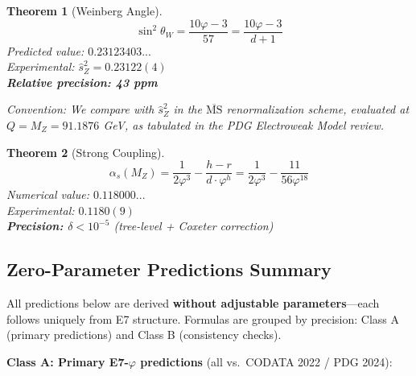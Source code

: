 \documentclass[11pt,a4paper]{article}
\newtheorem{theorem}{Theorem}
\begin{document}
\begin{theorem}[Weinberg Angle]
\begin{equation}
\sin^2\theta_W = \frac{10\varphi - 3}{57} = \frac{10\varphi - 3}{d + 1}
\end{equation}
Predicted value: $0.23123403...$\\
Experimental: $\hat{s}_Z^2 = 0.23122(4)$~\cite{PDG2024}\\
\textbf{Relative precision: 43 ppm}

\textit{Convention}: We compare with $\hat{s}_Z^2$ in the $\overline{\text{MS}}$ renormalization scheme, evaluated at $Q = M_Z = 91.1876$ GeV, as tabulated in the PDG Electroweak Model review.
\end{theorem}

\begin{theorem}[Strong Coupling]
\begin{equation}
\alpha_s(M_Z) = \frac{1}{2\varphi^3} - \frac{h - r}{d \cdot \varphi^h} = \frac{1}{2\varphi^3} - \frac{11}{56\varphi^{18}}
\end{equation}
Numerical value: $0.118000...$\\
Experimental: $0.1180(9)$~\cite{PDG2024}\\
\textbf{Precision: $\delta < 10^{-5}$} (tree-level + Coxeter correction)
\end{theorem}

\subsection{Zero-Parameter Predictions Summary}

All predictions below are derived \textbf{without adjustable parameters}---each follows uniquely from E7 structure. Formulas are grouped by precision: Class A (primary predictions) and Class B (consistency checks).

\textbf{Class A: Primary E7-$\varphi$ predictions} (all vs.\ CODATA 2022 / PDG 2024):
\end{document}
